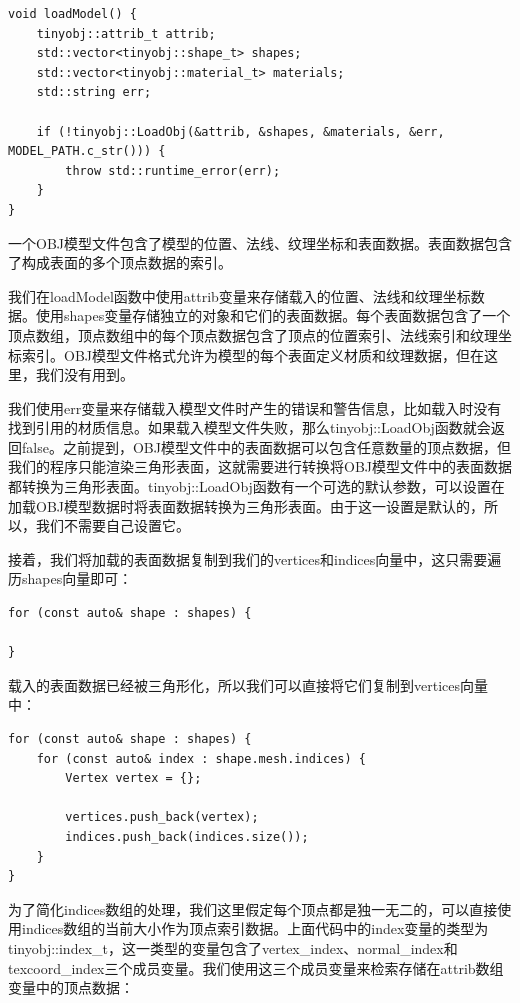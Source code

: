 \documentclass{ctexart}
\begin{document}
\begin{lstlisting}[language={[ANSI]C}]
void loadModel() {
	tinyobj::attrib_t attrib;
	std::vector<tinyobj::shape_t> shapes;
	std::vector<tinyobj::material_t> materials;
	std::string err;

	if (!tinyobj::LoadObj(&attrib, &shapes, &materials, &err, MODEL_PATH.c_str())) {
		throw std::runtime_error(err);
	}
}
\end{lstlisting}

一个OBJ模型文件包含了模型的位置、法线、纹理坐标和表面数据。表面数据包含了构成表面的多个顶点数据的索引。

我们在loadModel函数中使用attrib变量来存储载入的位置、法线和纹理坐标数据。使用shapes变量存储独立的对象和它们的表面数据。每个表面数据包含了一个顶点数组，顶点数组中的每个顶点数据包含了顶点的位置索引、法线索引和纹理坐标索引。OBJ模型文件格式允许为模型的每个表面定义材质和纹理数据，但在这里，我们没有用到。

我们使用err变量来存储载入模型文件时产生的错误和警告信息，比如载入时没有找到引用的材质信息。如果载入模型文件失败，那么tinyobj::LoadObj函数就会返回false。之前提到，OBJ模型文件中的表面数据可以包含任意数量的顶点数据，但我们的程序只能渲染三角形表面，这就需要进行转换将OBJ模型文件中的表面数据都转换为三角形表面。tinyobj::LoadObj函数有一个可选的默认参数，可以设置在加载OBJ模型数据时将表面数据转换为三角形表面。由于这一设置是默认的，所以，我们不需要自己设置它。

接着，我们将加载的表面数据复制到我们的vertices和indices向量中，这只需要遍历shapes向量即可：

\begin{lstlisting}[language={[ANSI]C}]
for (const auto& shape : shapes) {

}
\end{lstlisting}

载入的表面数据已经被三角形化，所以我们可以直接将它们复制到vertices向量中：

\begin{lstlisting}[language={[ANSI]C}]
for (const auto& shape : shapes) {
	for (const auto& index : shape.mesh.indices) {
		Vertex vertex = {};

		vertices.push_back(vertex);
		indices.push_back(indices.size());
	}
}
\end{lstlisting}

为了简化indices数组的处理，我们这里假定每个顶点都是独一无二的，可以直接使用indices数组的当前大小作为顶点索引数据。上面代码中的index变量的类型为tinyobj::index\_t，这一类型的变量包含了vertex\_index、normal\_index和texcoord\_index三个成员变量。我们使用这三个成员变量来检索存储在attrib数组变量中的顶点数据：
\end{document}

